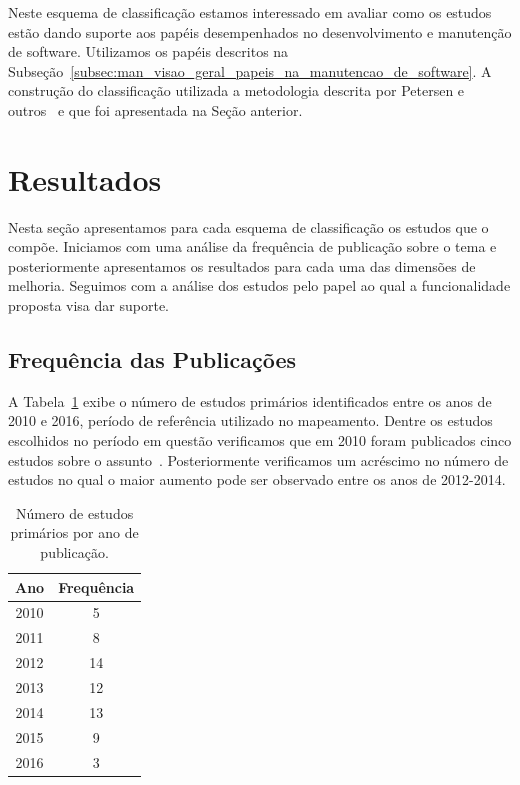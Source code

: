 Neste esquema de classificação estamos interessado em avaliar como os estudos
estão dando suporte aos papéis desempenhados no desenvolvimento e manutenção de
software.  Utilizamos os papéis descritos na
Subseção~\ref{subsec:man_visao_geral_papeis_na_manutencao_de_software}. A
construção do classificação utilizada a metodologia descrita por Petersen e
outros~\cite{Petersen2008} e que foi apresentada na Seção anterior.

\section{Resultados}
\label{sec:mapeamento_resultados}

Nesta seção apresentamos para cada esquema de classificação os estudos que o
compõe. Iniciamos com uma análise da frequência de publicação sobre o tema e
posteriormente apresentamos os resultados para cada uma das dimensões de
melhoria. Seguimos com a análise dos estudos pelo papel ao qual a funcionalidade
proposta visa dar suporte.

\subsection{Frequência das Publicações}
\label{sub:frequencia_publicacao}

A Tabela~\ref{tab:publicacao_por_ano} exibe o número de estudos primários
identificados entre os anos de 2010 e 2016, período de referência utilizado no
mapeamento. Dentre os estudos escolhidos no período em questão verificamos que
em 2010 foram publicados cinco estudos sobre o
assunto~\cite{sun2010discriminative,gegick2010identifying,song2010jdf,nagwani2010predictive,zimmermann2010makes}.
Posteriormente verificamos um acréscimo no número de estudos no qual o maior
aumento pode ser observado entre os anos de 2012\@-\@2014.

\begin{table}[htpb]
\centering
\begin{tabular}{@{}cc@{}}
\toprule
\multicolumn{1}{l}{\textbf{Ano}} & \textbf{Frequência} \\ \midrule
2010 & 5 \\
2011 & 8 \\
2012 & 14 \\
2013 & 12 \\
2014 & 13 \\
2015 & 9 \\
2016 & 3 \\ \bottomrule
\end{tabular}
\caption{Número de estudos primários por ano de publicação.}
\label{tab:publicacao_por_ano}
\end{table}

